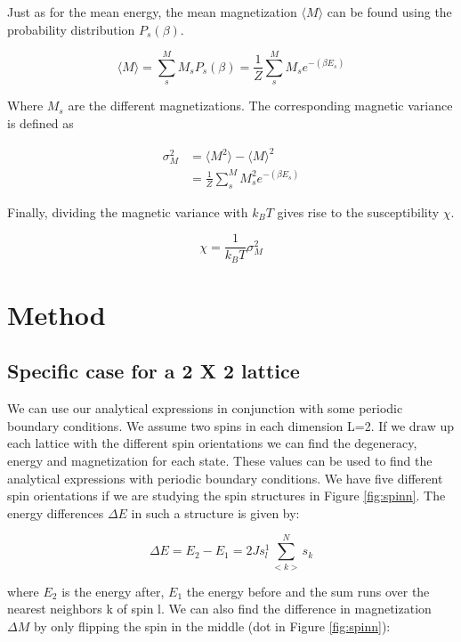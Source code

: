 \documentclass{article}
\begin{document}
\begin{multicols}{2}
Just as for the mean energy, the mean magnetization $\langle M \rangle$ can be found using the probability distribution $P_s(\beta)$.

\begin{equation}
\langle M \rangle=\sum_s^M M_s P_s(\beta)=\frac{1}{Z}\sum_s^M M_s e^{-(\beta E_s)}
\label{eq:mM}
\end{equation}

Where $M_s$ are the different magnetizations. The corresponding magnetic variance is defined as

\begin{equation}
\begin{split}
\sigma_M^2&=\langle M^2 \rangle-\langle M \rangle^2 \\
& = \frac{1}{Z}\sum_s^M M_s^2 e^{-(\beta E_s)}
\end{split}
\label{eq:M_v}
\end{equation}

Finally, dividing the magnetic variance with $k_B T$ gives rise to the susceptibility $\chi$.

\begin{equation}
\chi = \frac{1}{k_BT}\sigma_M^2
\label{eq:chi}
\end{equation}


\section{Method}

\subsection*{Specific case for a 2 X 2 lattice}

We can use our analytical expressions in conjunction with some periodic boundary conditions. We assume two spins in each dimension L=2. If we draw up each lattice with the different spin orientations we can find the degeneracy, energy and magnetization for each state. These values can be used to find the analytical expressions with periodic boundary conditions. We have five different spin orientations if we are studying the spin structures in Figure \ref{fig:spinn}. The energy differences $\Delta E$ in such a structure is given by:

\begin{equation}
\Delta E = E_2 - E_1 =  2J s_l^1\sum_{<k>}^N s_k
\label{eq:dE}
\end{equation}

where $E_2$ is the energy after, $E_1$ the energy before and the sum runs  over the nearest neighbors k of spin l. We can also find the difference in magnetization $\Delta M$ by only flipping the spin in the middle (dot in Figure \ref{fig:spinn}):


\end{multicols}
\end{document}
